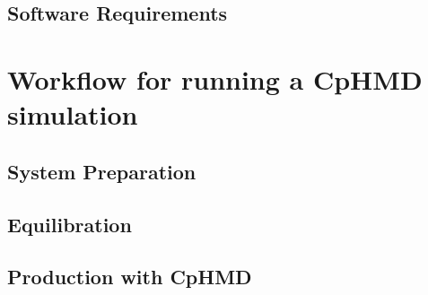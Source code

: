 \documentclass{article}
\begin{document}
\subsection{Software Requirements}

\section{Workflow for running a CpHMD simulation}

\subsection{System Preparation} %


\subsection{Equilibration}

\subsection{Production with CpHMD}
\end{document}
